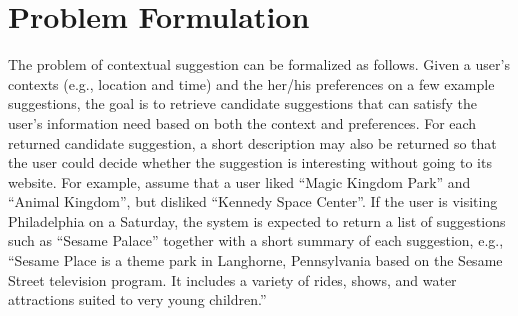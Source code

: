


\section{Problem Formulation} 
\label{sec:chap5prob}

The problem of contextual suggestion can be formalized 
as follows. Given a user's contexts (e.g., location
and time) and the her/his preferences on a few example
suggestions, the goal is to retrieve candidate 
suggestions that can satisfy the user's information 
need based on both the context and preferences. 
For each returned candidate suggestion, a short description 
may also be returned so that the user could decide whether 
the suggestion is interesting without going to its website.
For example, assume that a user liked ``Magic Kingdom Park'' 
and ``Animal Kingdom'', but disliked ``Kennedy Space Center''. 
If the user is visiting Philadelphia on a Saturday, the system 
is expected to return a list of suggestions such as ``Sesame Palace'' 
together with a short summary of each suggestion, 
e.g., ``Sesame Place is a theme park in Langhorne, Pennsylvania based on 
the Sesame Street television program. It includes a variety of rides, shows, 
and water attractions suited to very young children.''

